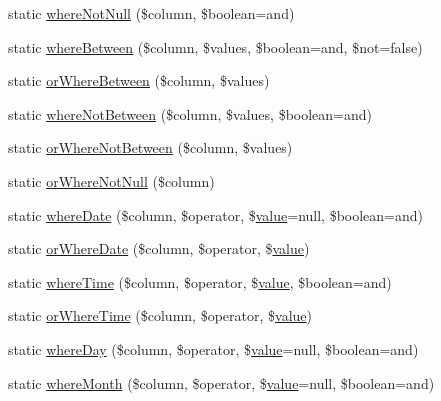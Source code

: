 \begin{DoxyCompactItemize}
\item 
static \mbox{\hyperlink{class_eloquent_a16cb0cdb621e7bfeec2cd87af4a224db}{where\+Not\+Null}} (\$column, \$boolean=\textquotesingle{}and\textquotesingle{})
\item 
static \mbox{\hyperlink{class_eloquent_a4fa71165cd2667a557c0125fa3292896}{where\+Between}} (\$column, \$values, \$boolean=\textquotesingle{}and\textquotesingle{}, \$not=false)
\item 
static \mbox{\hyperlink{class_eloquent_a0e1487272eea316ffc9019c50e8aa025}{or\+Where\+Between}} (\$column, \$values)
\item 
static \mbox{\hyperlink{class_eloquent_aa337ce79cac3593ee4c6fdf072b3528d}{where\+Not\+Between}} (\$column, \$values, \$boolean=\textquotesingle{}and\textquotesingle{})
\item 
static \mbox{\hyperlink{class_eloquent_a17c4940b6622bb7210567714b237b23a}{or\+Where\+Not\+Between}} (\$column, \$values)
\item 
static \mbox{\hyperlink{class_eloquent_a0f49fc5796ee0ed0b9d8c8bda60718e4}{or\+Where\+Not\+Null}} (\$column)
\item 
static \mbox{\hyperlink{class_eloquent_a5f295e03df6a9022fa12ce9a1607d08d}{where\+Date}} (\$column, \$operator, \$\mbox{\hyperlink{class_eloquent_a653061eb837042f61e82447886e15a72}{value}}=null, \$boolean=\textquotesingle{}and\textquotesingle{})
\item 
static \mbox{\hyperlink{class_eloquent_abac95061fffa73cb51b275e5ee5fa09a}{or\+Where\+Date}} (\$column, \$operator, \$\mbox{\hyperlink{class_eloquent_a653061eb837042f61e82447886e15a72}{value}})
\item 
static \mbox{\hyperlink{class_eloquent_ac534556e3ff4230a01e36cf6c4131cc7}{where\+Time}} (\$column, \$operator, \$\mbox{\hyperlink{class_eloquent_a653061eb837042f61e82447886e15a72}{value}}, \$boolean=\textquotesingle{}and\textquotesingle{})
\item 
static \mbox{\hyperlink{class_eloquent_a00cf4a8d42cc19861a94719dbb5177e4}{or\+Where\+Time}} (\$column, \$operator, \$\mbox{\hyperlink{class_eloquent_a653061eb837042f61e82447886e15a72}{value}})
\item 
static \mbox{\hyperlink{class_eloquent_a8442c6da11bda9fe1fad7b412ce48ec9}{where\+Day}} (\$column, \$operator, \$\mbox{\hyperlink{class_eloquent_a653061eb837042f61e82447886e15a72}{value}}=null, \$boolean=\textquotesingle{}and\textquotesingle{})
\item 
static \mbox{\hyperlink{class_eloquent_a530752faf5aed57517a152e74eceffd3}{where\+Month}} (\$column, \$operator, \$\mbox{\hyperlink{class_eloquent_a653061eb837042f61e82447886e15a72}{value}}=null, \$boolean=\textquotesingle{}and\textquotesingle{})

\end{DoxyCompactItemize}

